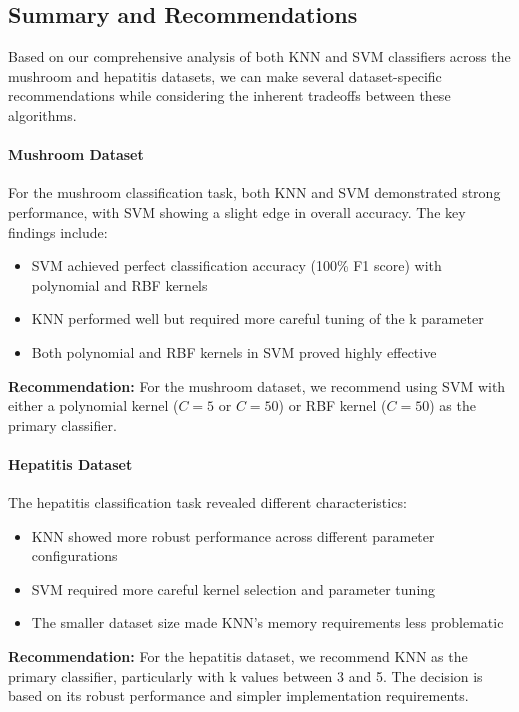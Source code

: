 \subsection{Summary and Recommendations}

Based on our comprehensive analysis of both KNN and SVM classifiers across the mushroom and hepatitis datasets, we can make several dataset-specific recommendations while considering the inherent tradeoffs between these algorithms.

\paragraph{Mushroom Dataset}
For the mushroom classification task, both KNN and SVM demonstrated strong performance, with SVM showing a slight edge in overall accuracy. The key findings include:

\begin{itemize}
    \item SVM achieved perfect classification accuracy (100\% F1 score) with polynomial and RBF kernels
    \item KNN performed well but required more careful tuning of the k parameter
    \item Both polynomial and RBF kernels in SVM proved highly effective
\end{itemize}

\textbf{Recommendation:} For the mushroom dataset, we recommend using SVM with either a polynomial kernel ($C=5$ or $C=50$) or RBF kernel ($C=50$) as the primary classifier.

\paragraph{Hepatitis Dataset}
The hepatitis classification task revealed different characteristics:

\begin{itemize}
    \item KNN showed more robust performance across different parameter configurations
    \item SVM required more careful kernel selection and parameter tuning
    \item The smaller dataset size made KNN's memory requirements less problematic
\end{itemize}

\textbf{Recommendation:} For the hepatitis dataset, we recommend KNN as the primary classifier, particularly with k values between 3 and 5. The decision is based on its robust performance and simpler implementation requirements.

